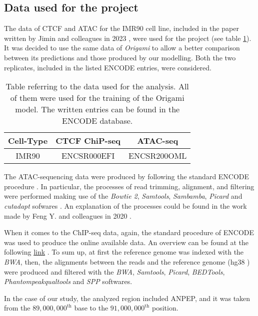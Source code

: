 \subsection{Data used for the project} \label{methods: data used}
The data of CTCF and ATAC for the IMR90 cell line, included in the paper written by Jimin and colleagues in 2023
\cite{tanCelltypespecificPrediction3D2023},
were used for the project (see table \ref{tab:data}). It was decided to use the same data of \textit{Origami} to allow a better comparison between its predictions and those produced by our modelling. Both the two replicates, included in the listed ENCODE entries, were considered.

\begin{table}[H]
    \centering
    \begin{tabular}{|c|c|c|}
        \hline
        \textbf{Cell-Type} & \textbf{CTCF ChiP-seq} & \textbf{ATAC-seq}\\
        \hline
        IMR90 & ENCSR000EFI & ENCSR200OML\\
        \hline
    \end{tabular}
    \caption{Table referring to the data used for the analysis. All of them were used for the training of the Origami\cite{tanCelltypespecificPrediction3D2023} model. The written entries can be found in the ENCODE database\cite{encodeprojectconsortiumIntegratedEncyclopediaDNA2012}.}
    \label{tab:data}
\end{table}

The ATAC-sequencing data were produced by following the standard ENCODE procedure
\cite{ATACseqUnreplicatedENCODE}. 
In particular, the processes of read trimming, alignment, and filtering were performed making use of the \textit{Bowtie 2}, \textit{Samtools}, \textit{Sambamba}, \textit{Picard} and \textit{cutadapt} sofwares
\cite{j.michaelcherryATACSeqPipeline}. 
An explanation of the processes could be found in the work made by Feng Y. and colleagues in 2020
\cite{yanReadsInsightHitchhiker2020}.

When it comes to the ChIP-seq data, again, the standard procedure of ENCODE was used to produce the online available data. An overview can be found at the following \href{https://www.encodeproject.org/chip-seq/transcription_factor/}{link}
\cite{TranscriptionFactorChIPseq}.
To sum up, at first the reference genome was indexed with the \textit{BWA}, then, the alignments between the reads and the reference genome (hg38
\cite{HomoSapiensGenome})
were produced and filtered with the \textit{BWA}, \textit{Samtools}, \textit{Picard}, \textit{BEDTools}, \textit{Phantompeakqualtools} and \textit{SPP} softwares.


In the case of our study, the analyzed region included ANPEP, and it was taken from the $89,000,000^{\text{th}}$ base to the $91,000,000^{\text{th}}$ position.
